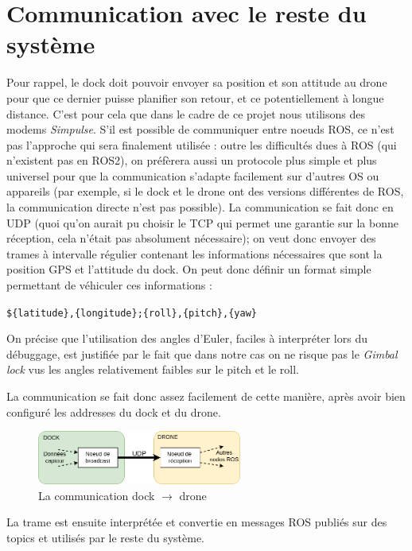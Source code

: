 \documentclass[12pt]{report}
\begin{document}
\section{Communication avec le reste du système}

Pour rappel, le dock doit pouvoir envoyer sa position et son attitude au drone pour que ce dernier puisse planifier son retour, et ce potentiellement à longue distance.  C'est pour cela que dans le cadre de ce projet nous utilisons des modems \textit{Simpulse}. S'il est possible de communiquer entre noeuds ROS, ce n'est pas l'approche qui sera finalement utilisée : outre les difficultés dues à ROS (qui n'existent pas en ROS2), on préfèrera aussi un protocole plus simple et plus universel pour que la communication s'adapte facilement sur d'autres OS ou appareils (par exemple, si le dock et le drone ont des versions différentes de ROS, la communication directe n'est pas possible). La communication se fait donc en UDP (quoi qu'on aurait pu choisir le TCP qui permet une garantie sur la bonne réception, cela n'était pas absolument nécessaire); on veut donc envoyer des trames à intervalle régulier contenant les informations nécessaires que sont la position GPS et l'attitude du dock. On peut donc définir un format simple permettant de véhiculer ces informations :

\verb|${latitude},{longitude};{roll},{pitch},{yaw}|

On précise que l'utilisation des angles d'Euler, faciles à interpréter lors du débuggage, est justifiée par le fait que dans notre cas on ne risque pas le \textit{Gimbal lock} vus les angles relativement faibles sur le pitch et le roll.

La communication se fait donc assez facilement de cette manière, après avoir bien configuré les addresses du dock et du drone.

\begin{figure}[H]
    \centering
    \includegraphics[width=0.6\textwidth]{imgs/UDP_connexion.png}
    \caption{La communication dock $\rightarrow$ drone}
\end{figure}

La trame est ensuite interprétée et convertie en messages ROS publiés sur des topics et utilisés par le reste du système.
\end{document}
